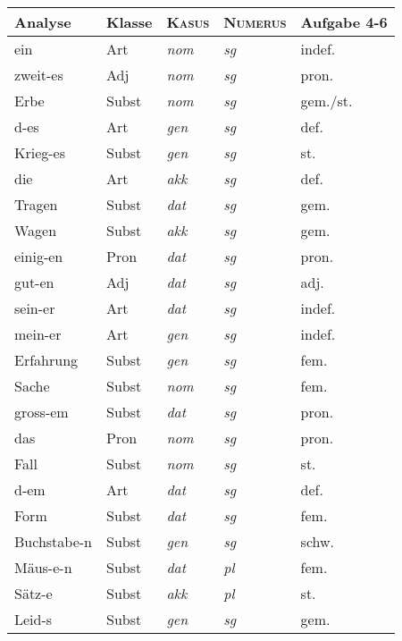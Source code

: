

\begin{center}
  \begin{tabular}{lllll}
    \lsptoprule
    \textbf{Analyse} & \textbf{Klasse} & \textbf{\textsc{Kasus}} & \textbf{\textsc{Numerus}} & \textbf{Aufgabe 4-6} \\
    \midrule
    ein & Art & \textit{nom} & \textit{sg} & indef. \\
    zweit-es & Adj & \textit{nom} & \textit{sg} & pron. \\
    Erbe & Subst & \textit{nom} & \textit{sg} & gem./st. \\
    d-es & Art & \textit{gen} & \textit{sg} & def. \\
    Krieg-es & Subst & \textit{gen} & \textit{sg} & st. \\
    die & Art & \textit{akk} & \textit{sg} & def. \\
    Tragen & Subst & \textit{dat} & \textit{sg} & gem. \\
    Wagen & Subst & \textit{akk} & \textit{sg} & gem. \\
    einig-en & Pron & \textit{dat} & \textit{sg} & pron. \\
    gut-en & Adj & \textit{dat} & \textit{sg} & adj. \\
    sein-er & Art & \textit{dat} & \textit{sg} & indef. \\
    mein-er & Art & \textit{gen} & \textit{sg} & indef. \\
    Erfahrung & Subst & \textit{gen} & \textit{sg} & fem. \\
    Sache & Subst & \textit{nom} & \textit{sg} & fem. \\
    gross-em & Subst & \textit{dat} & \textit{sg} & pron. \\
    das & Pron & \textit{nom} & \textit{sg} & pron. \\
    Fall & Subst & \textit{nom} & \textit{sg} & st. \\
    d-em & Art & \textit{dat} & \textit{sg} & def. \\
    Form & Subst & \textit{dat} & \textit{sg} & fem. \\
    Buchstabe-n & Subst & \textit{gen} & \textit{sg} & schw. \\
    Mäus-e-n & Subst & \textit{dat} & \textit{pl} & fem. \\
    Sätz-e & Subst & \textit{akk} & \textit{pl} & st. \\
    Leid-s & Subst & \textit{gen} & \textit{sg} & gem. \\

\end{tabular}
\end{center}
